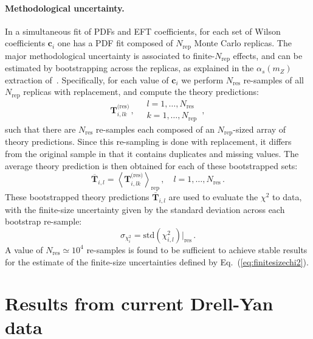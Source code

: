 \documentclass[withindex,glossary]{cam-thesis}
\begin{document}
\paragraph{Methodological uncertainty.} In a simultaneous fit of PDFs and EFT coefficients,
for each set of Wilson coefficients \(\mathbf{c}_i\)
one has a PDF fit composed of \(N_\text{rep}\) Monte Carlo replicas.
%
The major methodological uncertainty is associated to  finite-\(N_\text{rep}\) effects, and
can be estimated by bootstrapping across the replicas, as explained in the $\alpha_s(m_Z)$
extraction of~\cite{Ball:2018iqk}.
%
Specifically, for each value of \(\mathbf{c}_i\)
we perform \(N_\text{res}\) re-samples of all \(N_\text{rep}\) replicas with replacement, and compute the theory predictions:
\begin{equation}
  \mathbf{T}^{\text{(res)}}_{i,lk} \, ,\quad
  \begin{matrix}
    l = 1,\dots,N_\text{res} \\
    k = 1,\dots,N_\text{rep}
  \end{matrix} \, ,
\end{equation}
such that there are \(N_\text{res}\) re-samples each composed of an \(N_\text{rep}\)-sized array
of theory predictions.
%
Since this re-sampling is done with replacement,
it differs from the original sample in that it contains  duplicates and missing values.
%
The average theory prediction is then obtained for each of these bootstrapped sets:
\begin{equation}
  \overline{\mathbf{T}}_{i,l} = \left<\mathbf{T}^\text{(res)}_{i,lk}\right>_\text{rep}\, ,
  \quad l = 1,\dots,N_{\text{res}} \, .
\end{equation}
These bootstrapped  theory predictions $\overline{\mathbf{T}}_{i,l}$ are used to evaluate the $\chi^2$ to data,
with the finite-size uncertainty given by the standard deviation across each bootstrap re-sample:
\begin{equation}
  \label{eq:finitesizechi2}
  \sigma_{\chi^2_i} = \text{std}\left(\chi^2_{i,l}\right)\Big|_\text{res}\, .
\end{equation}
A value of $N_\text{res}\simeq 10^4$ re-samples is found to be sufficient to achieve stable results
for the estimate of the finite-size uncertainties defined by Eq.~(\ref{eq:finitesizechi2}).



\section{Results from current Drell-Yan data}
\label{sec:res1}
\end{document}
